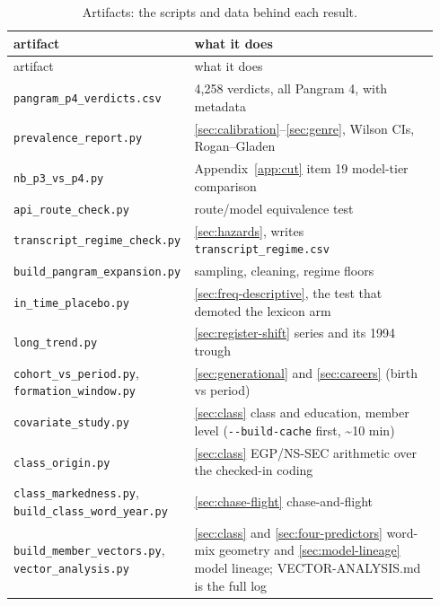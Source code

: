 \begingroup\small
\begin{longtable}[]{@{}p{0.36\linewidth}p{0.58\linewidth}@{}}
\caption{Artifacts: the scripts and data behind each result.}\label{tab:artifacts}\\
\toprule\noalign{}
artifact & what it does \\
\midrule\noalign{}
\endfirsthead
\toprule\noalign{}
artifact & what it does \\
\midrule\noalign{}
\endhead
\bottomrule\noalign{}
\endlastfoot
\texttt{pangram\_\allowbreak{}p4\_\allowbreak{}verdicts.\allowbreak{}csv} & 4,258 verdicts, all Pangram 4, with metadata \\
\texttt{prevalence\_report.py} & \cref{sec:calibration}--\cref{sec:genre}, Wilson CIs, Rogan--Gladen \\
\texttt{nb\_p3\_vs\_p4.py} & Appendix~\ref{app:cut} item 19 model-tier comparison \\
\texttt{api\_route\_check.py} & route/model equivalence test \\
\texttt{transcript\_\allowbreak{}regime\_\allowbreak{}check.\allowbreak{}py} & \cref{sec:hazards}, writes \texttt{transcript\_regime.csv} \\
\texttt{build\_\allowbreak{}pangram\_\allowbreak{}expansion.\allowbreak{}py} & sampling, cleaning, regime floors \\
\texttt{in\_time\_placebo.py} & \cref{sec:freq-descriptive}, the test that demoted the lexicon arm \\
\texttt{long\_trend.py} & \cref{sec:register-shift} series and its 1994 trough \\
\texttt{cohort\_vs\_period.py}, \texttt{formation\_window.py} & \cref{sec:generational} and \cref{sec:careers} (birth vs period) \\
\texttt{covariate\_study.py} & \cref{sec:class} class and education, member level (\texttt{-\/-build-cache} first, \textasciitilde10 min) \\
\texttt{class\_origin.py} & \cref{sec:class} EGP/NS-SEC arithmetic over the checked-in coding \\
\texttt{class\_markedness.py}, \texttt{build\_\allowbreak{}class\_\allowbreak{}word\_\allowbreak{}year.\allowbreak{}py} & \cref{sec:chase-flight} chase-and-flight \\
\texttt{build\_\allowbreak{}member\_\allowbreak{}vectors.\allowbreak{}py}, \texttt{vector\_analysis.py} & \cref{sec:class} and \cref{sec:four-predictors} word-mix geometry and \cref{sec:model-lineage} model lineage; VECTOR-ANALYSIS.md is the full log \\

\end{longtable}
